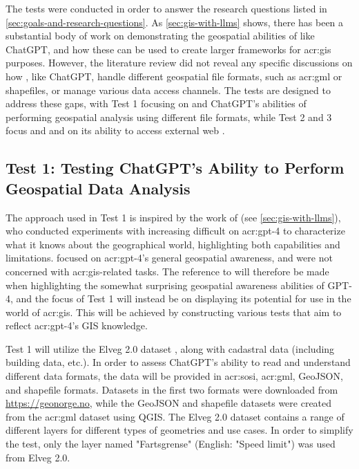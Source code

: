 The tests were conducted in order to answer the research questions listed in \autoref{sec:goals-and-research-questions}. As \autoref{sec:gis-with-llms} shows, there has been a substantial body of work on demonstrating the geospatial abilities of  like ChatGPT, and how these can be used to create larger frameworks for \acrshort{acr:gis} purposes. However, the literature review did not reveal any specific discussions on how , like ChatGPT, handle different geospatial file formats, such as \acrshort{acr:gml} or shapefiles, or manage various data access channels. The tests are designed to address these gaps, with Test 1 focusing on  and ChatGPT's abilities of performing geospatial analysis using different file formats, while Test 2 and 3 focus  and  and on its ability to access external web .

\subsection{Test 1: Testing ChatGPT's Ability to Perform Geospatial Data Analysis}

The approach used in Test 1 is inspired by the work of \cite{robertsGPT4GEOHowLanguage2023} (see \autoref{sec:gis-with-llms}), who conducted experiments with increasing difficult on \acrshort{acr:gpt}-4 to characterize what it knows about the geographical world, highlighting both capabilities and limitations. \citeauthor{robertsGPT4GEOHowLanguage2023} focused on \acrshort{acr:gpt}-4's general geospatial awareness, and were not concerned with \acrshort{acr:gis}-related tasks. The reference to \cite{robertsGPT4GEOHowLanguage2023} will therefore be made when highlighting the somewhat surprising geospatial awareness abilities of GPT-4, and the focus of Test 1 will instead be on displaying its potential for use in the world of \acrshort{acr:gis}. This will be achieved by constructing various tests that aim to reflect \acrshort{acr:gpt}-4's GIS knowledge.

Test 1 will utilize the Elveg 2.0 dataset \citep{thenorwegianmappingauthorityElveg2019}, along with cadastral data (including building data, etc.). In order to assess ChatGPT's ability to read and understand different data formats, the data will be provided in \acrshort{acr:sosi}, \acrshort{acr:gml}, GeoJSON, and shapefile formats. Datasets in the first two formats were downloaded from \url{https://geonorge.no}, while the GeoJSON and shapefile datasets were created from the \acrshort{acr:gml} dataset using QGIS. The Elveg 2.0 dataset contains a range of different layers for different types of geometries and use cases. In order to simplify the test, only the layer named "Fartsgrense" (English: "Speed limit") was used from Elveg 2.0.


